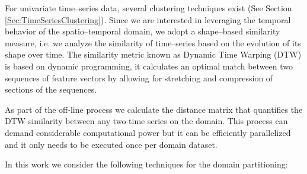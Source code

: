 For univariate time--series data, several clustering techniques exist (See Section \ref{Sec:TimeSeriesClustering}). Since we are interested in leveraging the temporal behavior of the spatio--temporal domain, we adopt a shape--based similarity measure, i.e. we analyze the similarity of time--series based on the evolution of its shape over time. The similarity metric known as Dynamic Time Warping (DTW) \cite{Sakoe1978} is based on dynamic programming, it calculates an optimal match between two sequences of feature vectors by allowing for stretching and compression of sections of the sequences. 

As part of the off-line process we calculate the distance matrix that quantifies the DTW similarity between any two time series on the domain. This process can demand considerable computational power but it can be efficiently parallelized and it only needs to be executed once per domain dataset. 

In this work we consider the following techniques for the domain partitioning:


